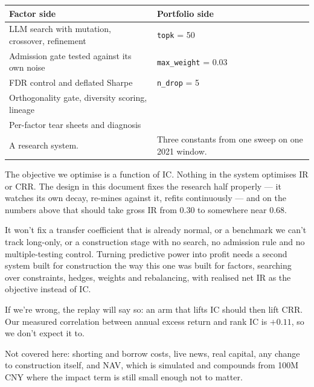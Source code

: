 \documentclass[11pt]{article}
\begin{document}
\begin{table}[h]
\centering
\small
\begin{tabular}{p{6.3cm}p{6.3cm}}
\toprule
\textbf{Factor side} & \textbf{Portfolio side} \\
\midrule
LLM search with mutation, crossover, refinement & \texttt{topk} = 50 \\
Admission gate tested against its own noise & \texttt{max\_weight} = 0.03 \\
FDR control and deflated Sharpe & \texttt{n\_drop} = 5 \\
Orthogonality gate, diversity scoring, lineage & \\
Per-factor tear sheets and diagnosis & \\
\midrule
A research system. & Three constants from one sweep on one 2021 window. \\
\bottomrule
\end{tabular}
\end{table}

The objective we optimise is a function of IC. Nothing in the system optimises IR
or CRR. The design in this document fixes the research half properly --- it watches
its own decay, re-mines against it, refits continuously --- and on the numbers
above that should take gross IR from 0.30 to somewhere near 0.68.

It won't fix a transfer coefficient that is already normal, or a benchmark we can't
track long-only, or a construction stage with no search, no admission rule and no
multiple-testing control. Turning predictive power into profit needs a second
system built for construction the way this one was built for factors, searching
over constraints, hedges, weights and rebalancing, with realised net IR as the
objective instead of IC.

If we're wrong, the replay will say so: an arm that lifts IC should then lift CRR.
Our measured correlation between annual excess return and rank IC is $+0.11$, so we
don't expect it to.

Not covered here: shorting and borrow costs, live news, real capital, any change to
construction itself, and NAV, which is simulated and compounds from 100M CNY where the
impact term is still small enough not to matter.
\end{document}

